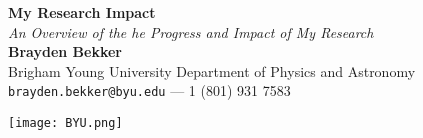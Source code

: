 \documentclass[a0,portrait]{a0poster}
\begin{document}


\begin{minipage}[b]{0.75\linewidth}
\veryHuge \color{NavyBlue} \textbf{My Research Impact} \color{Black}\\ %
\Huge\textit{An Overview of the he Progress and Impact of My Research}\\[2cm] %
\huge \textbf{Brayden Bekker}\\[0.5cm] %
\huge Brigham Young University Department of Physics and Astronomy\\[0.4cm] %
\Large \texttt{brayden.bekker@byu.edu} --- 1 (801) 931 7583\\
\end{minipage}
%
\begin{minipage}[b]{0.25\linewidth}
\texttt{[image: BYU.png]}\\
\end{minipage}

\vspace{1cm} %

\end{document}
